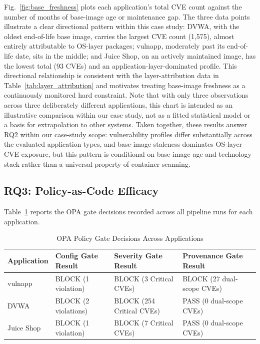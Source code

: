 \documentclass[conference]{IEEEtran}
\begin{document}
Fig.~\ref{fig:base_freshness} plots each application's total CVE count against the number of months of base-image age or maintenance gap. The three data points illustrate a clear directional pattern within this case study: DVWA, with the oldest end-of-life base image, carries the largest CVE count (1,575), almost entirely attributable to OS-layer packages; vulnapp, moderately past its end-of-life date, sits in the middle; and Juice Shop, on an actively maintained image, has the lowest total (93 CVEs) and an application-layer-dominated profile. This directional relationship is consistent with the layer-attribution data in Table~\ref{tab:layer_attribution} and motivates treating base-image freshness as a continuously monitored hard constraint. Note that with only three observations across three deliberately different applications, this chart is intended as an illustrative comparison within our case study, not as a fitted statistical model or a basis for extrapolation to other systems. Taken together, these results answer RQ2 within our case-study scope: vulnerability profiles differ substantially across the evaluated application types, and base-image staleness dominates OS-layer CVE exposure, but this pattern is conditional on base-image age and technology stack rather than a universal property of container scanning.

\subsection{RQ3: Policy-as-Code Efficacy}
Table~\ref{tab:opa_gates} reports the OPA gate decisions recorded across all pipeline runs for each application.

\begin{table}[t]
\centering
\caption{OPA Policy Gate Decisions Across Applications}
\label{tab:opa_gates}
\footnotesize
\begin{tabular}{|l|l|l|l|}
\hline
\textbf{Application} & \textbf{Config Gate Result} & \textbf{Severity Gate Result} & \textbf{Provenance Gate Result} \\
\hline
vulnapp    & BLOCK (1 violation) & BLOCK (3 Critical CVEs) & BLOCK (27 dual-scope CVEs) \\
DVWA       & BLOCK (2 violations) & BLOCK (254 Critical CVEs) & PASS (0 dual-scope CVEs) \\
Juice Shop & BLOCK (1 violation) & BLOCK (7 Critical CVEs) & PASS (0 dual-scope CVEs) \\
\hline
\end{tabular}
\end{table}
\end{document}
